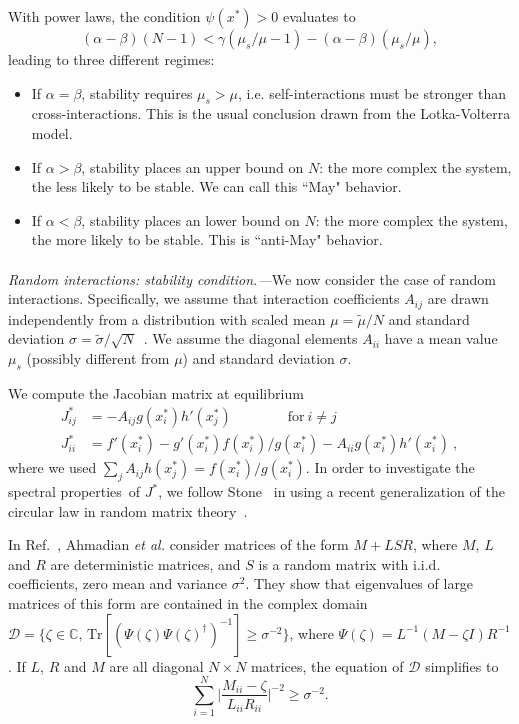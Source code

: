 \documentclass[
 prl,
 twocolumn,
 amsmath,
 amssymb,
 aps,
]{revtex4-2}
\begin{document}
With power laws, the condition $\psi(x^*)>0$ evaluates to 
\begin{equation}
    (\alpha - \beta)(N-1) < \gamma(\mu_s/\mu- 1) - (\alpha - \beta)(\mu_s/\mu),
\end{equation}
leading to three different regimes:
\begin{itemize}
    \item If $\alpha = \beta$, stability requires $\mu_s > \mu$, i.e.
    self-interactions must be stronger than cross-interactions.
    This is the usual conclusion drawn from the Lotka-Volterra model.
    \item If $\alpha > \beta$, stability places an upper bound on $N$: the more complex the system, the less likely to be stable.
    We can call this ``May" behavior.
    \item If $\alpha < \beta$, stability places an lower bound on $N$: the more complex the system, the more likely to be stable.
    This is ``anti-May" behavior.
\end{itemize}

\paragraph*{}
\emph{Random interactions: stability condition.---}We now consider the case of random interactions.
Specifically, we assume that interaction coefficients $A_{ij}$ are drawn independently from a distribution with scaled mean $\mu=\tilde{\mu}/N$ and standard deviation $\sigma=\tilde{\sigma}/\sqrt{N}$~\cite{bunin2017ecological}.
We assume the diagonal elements $A_{ii}$ have a mean value $\mu_s$ (possibly different from $\mu$) and standard deviation $\sigma$. 
 
We compute the Jacobian matrix at equilibrium
\begin{align}
    J_{ij}^* & = - A_{ij}g(x_i^*)h'(x_j^*) \qquad \qquad \textrm{for} \ i\neq j \label{eq: jac off-diag}\\
    J_{ii}^* & = f'(x_i^*) - g'(x_i^*)f(x_i^*)/g(x_i^*) - A_{ii}g(x_i^*)h'(x_i^*) \ , \label{eq: jac diag}
\end{align}
where we used $\sum_{j}A_{ij}h(x_j^*)=f(x_i^*)/g(x_i^*)$.
In order to investigate the spectral properties of $J^*$, 
we follow Stone~\cite{Stone2018} in using a recent generalization of the circular law in random matrix theory~\cite{Ahmadian2015}.

In Ref.~\cite{Ahmadian2015}, Ahmadian \emph{et al.} consider matrices of the form $M + LSR$, where $M$,  
$L$ and $R$ are deterministic matrices, and $S$ is a random matrix with i.i.d. coefficients, zero mean and variance $\sigma^2$.
They show that eigenvalues of large matrices of this form are contained in the complex domain $\mathcal{D} = \{\zeta \in \mathbb{C},\, \textrm{Tr}[(\Psi(\zeta) \Psi(\zeta)^\dagger)^{-1}]\geq \sigma^{-2}\}$, where $\Psi(\zeta) = L^{-1}(M-\zeta I)R^{-1}$. If $L$, $R$ and $M$ are all diagonal $N\times N$ matrices, the equation of $\mathcal{D}$ simplifies to 
\begin{equation}
    \sum_{i=1}^N\Big\vert\frac{M_{ii} - \zeta}{L_{ii}R_{ii}}\Big\vert^{-2}\geq \sigma^{-2}.
\label{eq: domain}
\end{equation}
\end{document}

